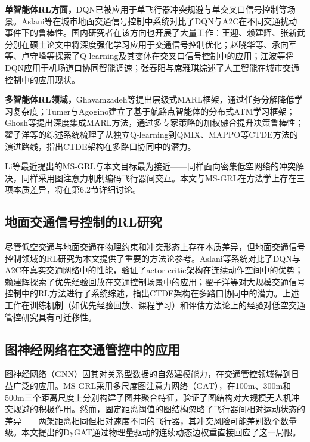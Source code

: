 \documentclass[12pt,a4paper,UTF8]{ctexart}
\begin{document}
\textbf{单智能体RL方面，}DQN已被应用于单飞行器冲突规避与单交叉口信号控制等场景。Aslani等在城市地面交通信号控制中系统对比了DQN与A2C在不同交通扰动事件下的鲁棒性\cite{ref10}。国内研究者在该方向也开展了大量工作：王迎\cite{ref13}、赖建辉\cite{ref16}、张新武\cite{ref17}分别在硕士论文中将深度强化学习应用于交通信号控制优化；赵晓华等\cite{ref14}、承向军等\cite{ref15}、卢守峰等\cite{ref18}探索了Q-learning及其变体在交叉口信号控制中的应用；江波等将DQN应用于机场道口协同智能调速\cite{ref19}；张春阳与席雅琪综述了人工智能在城市交通控制中的应用现状\cite{ref8}。

\textbf{多智能体RL领域，}Ghavamzadeh等提出层级式MARL框架，通过任务分解降低学习复杂度\cite{ref12}；Tumer与Agogino建立了基于航路点智能体的分布式ATM学习框架\cite{ref2,ref4,ref5}；Ghosh等提出深度集成MARL方法，通过多专家策略的加权融合提升决策鲁棒性\cite{ref9}；翟子洋等的综述系统梳理了从独立Q-learning到QMIX、MAPPO等CTDE方法的演进路线，指出CTDE架构在多路口协同中的潜力\cite{ref11}。

Li等最近提出的MS-GRL\cite{ref24}与本文目标最为接近——同样面向密集低空网络的冲突解决，同样采用图注意力机制编码飞行器间交互。本文与MS-GRL在方法学上存在三项本质差异，将在第6.2节详细讨论。

\subsection{地面交通信号控制的RL研究}

尽管低空交通与地面交通在物理约束和冲突形态上存在本质差异，但地面交通信号控制领域的RL研究为本文提供了重要的方法论参考。Aslani等\cite{ref10}系统对比了DQN与A2C在真实交通网络中的性能，验证了actor-critic架构在连续动作空间中的优势；赖建辉\cite{ref16}探索了优先经验回放在交通控制场景中的应用；翟子洋等\cite{ref11}对大规模交通信号控制中的RL方法进行了系统综述，指出CTDE架构在多路口协同中的潜力。上述工作在训练机制（如优先经验回放、课程学习）和评估方法论上的经验对低空交通管控研究具有可迁移性。

\subsection{图神经网络在交通管控中的应用}

图神经网络（GNN）因其对关系型数据的自然建模能力，在交通管控领域得到日益广泛的应用。MS-GRL\cite{ref24}采用多尺度图注意力网络（GAT），在100m、300m和500m三个距离尺度上分别构建子图并聚合特征，验证了图结构对大规模无人机冲突规避的积极作用。然而，固定距离阈值的图结构忽略了飞行器间相对运动状态的差异——两架距离相同但相对速度不同的飞行器，其冲突风险可能差别数个数量级。本文提出的DyGAT通过物理量驱动的连续动态边权重直接回应了这一局限。
\end{document}
